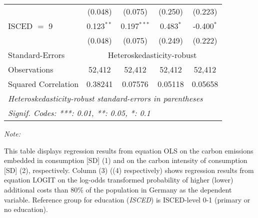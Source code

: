 \begin{table}[htbp!]
\begin{adjustbox}{width = 1\textwidth, max height = 0.95\textheight, center}
\begin{threeparttable}[b]
\begin{tabular}{lcccc}
                                 & (0.048)            & (0.075)            & (0.250)        & (0.223)\\   
            ISCED $=$ 9          & 0.123$^{**}$       & 0.197$^{***}$      & 0.483$^{*}$    & -0.400$^{*}$\\   
                                 & (0.048)            & (0.075)            & (0.249)        & (0.222)\\   
            \midrule 
            Standard-Errors & \multicolumn{4}{c}{Heteroskedasticity-robust} \\ 
            Observations         & 52,412             & 52,412             & 52,412         & 52,412\\  
            Squared Correlation  & 0.38241            & 0.07576            & 0.05118        & 0.05658\\  
            \midrule \midrule
            \multicolumn{5}{l}{\emph{Heteroskedasticity-robust standard-errors in parentheses}}\\
            \multicolumn{5}{l}{\emph{Signif. Codes: ***: 0.01, **: 0.05, *: 0.1}}\\
         \end{tabular}
         
         \begin{tablenotes}\item \medskip \textit{Note:}
            \item This table displays regression results from equation OLS on the carbon emissions embedded in consumption [SD] (1) and on the carbon intensity of consumption [SD] (2), respectively. 
                                      Column (3) ((4) respectively) shows regression results from equation LOGIT on the log-odds transformed probability of higher (lower) additional costs than 80\% of the population in Germany as the dependent variable. Reference group for education (\textit{ISCED}) is ISCED-level 0-1 (primary or no education).
         \end{tablenotes}
      \end{threeparttable}
   \end{adjustbox}
\end{table}


